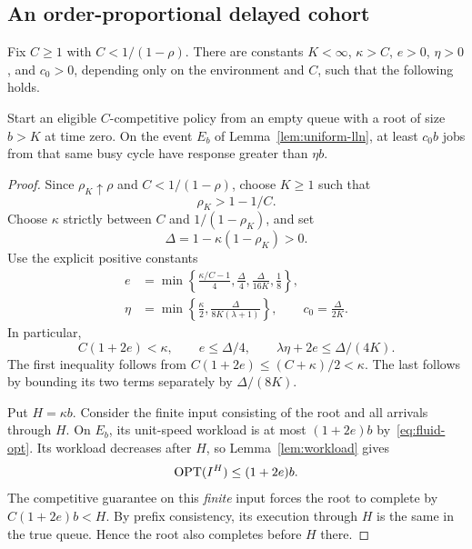 \subsection{An order-proportional delayed cohort}
\begin{lemma}\label{lem:deficit}
Fix $C\geq1$ with $C<1/(1-\rho)$. There are constants $K<\infty$, $\kappa>C$, $e>0$, $\eta>0$, and $c_0>0$, depending only on the environment and $C$, such that the following holds.

Start an eligible $C$-competitive policy from an empty queue with a root of size $b>K$ at time zero. On the event $E_b$ of Lemma~\ref{lem:uniform-lln}, at least $c_0b$ jobs from that same busy cycle have response greater than $\eta b$.
\end{lemma}
\begin{proof}
Since $\rho_K\uparrow\rho$ and $C<1/(1-\rho)$, choose $K\geq1$ such that
\begin{equation}\label{eq:K-choice}
 \rho_K>1-1/C.
\end{equation}
Choose $\kappa$ strictly between $C$ and $1/(1-\rho_K)$, and set
\begin{equation}\label{eq:Delta}
 \Delta=1-\kappa(1-\rho_K)>0.
\end{equation}
Use the explicit positive constants
\begin{align}
 e&=\min\left\{\frac{\kappa/C-1}{4},\frac\Delta4,
                  \frac\Delta{16K},\frac18\right\},\label{eq:epsilon-choice}\\
 \eta&=\min\left\{\frac\kappa2,
                   \frac\Delta{8K(\lambda+1)}\right\},
 \qquad c_0=\frac\Delta{2K}.\label{eq:eta-choice}
\end{align}
In particular,
\begin{equation}\label{eq:constant-inequalities}
 C(1+2e)<\kappa,
 \qquad e\leq\Delta/4,
 \qquad\lambda\eta+2e\leq\Delta/(4K).
\end{equation}
The first inequality follows from $C(1+2e)\leq(C+\kappa)/2<\kappa$. The last follows by bounding its two terms separately by $\Delta/(8K)$.

Put $H=\kappa b$. Consider the finite input consisting of the root and all arrivals through $H$. On $E_b$, its unit-speed workload is at most $(1+2e)b$ by~\eqref{eq:fluid-opt}. Its workload decreases after $H$, so Lemma~\ref{lem:workload} gives
\begin{equation}\label{eq:prefix-opt}
 \operatorname{OPT}(I^{H})\leq(1+2e)b.
\end{equation}
The competitive guarantee on this \emph{finite} input forces the root to complete by $C(1+2e)b<H$. By prefix consistency, its execution through $H$ is the same in the true queue. Hence the root also completes before $H$ there.


\end{proof}
